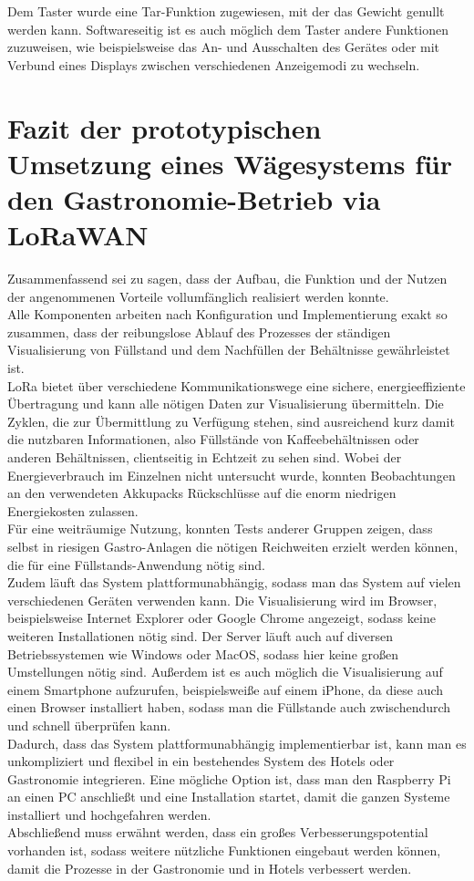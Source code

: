 \noindent
Dem Taster wurde eine Tar-Funktion zugewiesen, mit der das Gewicht genullt werden kann. Softwareseitig ist es auch möglich dem Taster andere Funktionen zuzuweisen, wie beispielsweise das An- und Ausschalten des Gerätes oder mit Verbund eines Displays zwischen verschiedenen Anzeigemodi zu wechseln.

\chapter{Fazit der prototypischen Umsetzung eines Wägesystems für den Gastronomie-Betrieb via LoRaWAN}
Zusammenfassend sei zu sagen, dass der Aufbau, die Funktion und der Nutzen der angenommenen Vorteile vollumfänglich realisiert werden konnte.\\
Alle Komponenten arbeiten nach Konfiguration und Implementierung exakt so zusammen, dass der reibungslose Ablauf des Prozesses der ständigen Visualisierung von Füllstand und dem Nachfüllen der Behältnisse gewährleistet ist.\\
LoRa bietet über verschiedene Kommunikationswege eine sichere, energieeffiziente Übertragung und kann alle nötigen Daten zur Visualisierung übermitteln. Die Zyklen, die zur Übermittlung zu Verfügung stehen, sind ausreichend kurz damit die nutzbaren Informationen, also Füllstände von Kaffeebehältnissen oder anderen Behältnissen, clientseitig in Echtzeit zu sehen sind. Wobei der Energieverbrauch im Einzelnen nicht untersucht wurde, konnten Beobachtungen an den verwendeten Akkupacks Rückschlüsse auf die enorm niedrigen Energiekosten zulassen.\\
Für eine weiträumige Nutzung, konnten Tests anderer Gruppen zeigen, dass selbst in riesigen Gastro-Anlagen die nötigen Reichweiten erzielt werden können, die für eine Füllstands-Anwendung nötig sind.\\
Zudem läuft das System plattformunabhängig, sodass man das System auf vielen verschiedenen Geräten verwenden kann. Die Visualisierung wird im Browser, beispielsweise Internet Explorer oder Google Chrome angezeigt, sodass keine weiteren Installationen nötig sind. Der Server läuft auch auf diversen Betriebssystemen wie Windows oder MacOS, sodass hier keine großen Umstellungen nötig sind. Außerdem ist es auch möglich die Visualisierung auf einem Smartphone aufzurufen, beispielsweiße auf einem iPhone, da diese auch einen Browser installiert haben, sodass man die Füllstande auch zwischendurch und schnell überprüfen kann.\\
Dadurch, dass das System plattformunabhängig implementierbar ist, kann man es unkompliziert und flexibel in ein bestehendes System des Hotels oder Gastronomie integrieren. Eine mögliche Option ist, dass man den Raspberry Pi an einen PC anschließt und eine Installation startet, damit die ganzen Systeme installiert und hochgefahren werden. \\
Abschließend muss erwähnt werden, dass ein großes Verbesserungspotential vorhanden ist, sodass weitere nützliche Funktionen eingebaut werden können, damit die Prozesse in der Gastronomie und in Hotels verbessert werden.

